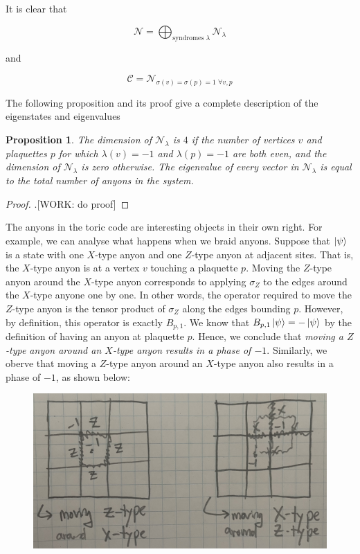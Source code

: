 \documentclass{article}
\newtheorem{proposition}{Proposition}[section]
\theoremstyle{definition}
\newcommand{\NN}{\mathcal{N}}
\newcommand{\C}{\mathscr{C}}
\newcommand{\0}{\left|0\right>}
\newcommand{\1}{\left|1\right>}
\numberwithin{figure}{section}
\begin{document}
It is clear that

$$\NN=\bigoplus_{\text{syndromes $\lambda$}}\NN_\lambda$$

and

$$\C=\NN_{\sigma(v)=\sigma(p)=1 \,\, \forall v,p}$$

The following proposition and its proof give a complete description of the eigenstates and eigenvalues

\begin{proposition}The dimension of $\NN_{\lambda}$ is $4$ if the number of vertices $v$ and plaquettes $p$ for which $\lambda(v)=-1$ and $\lambda(p)=-1$ are both even, and the dimension of $\NN_{\lambda}$ is zero otherwise. The eigenvalue of every vector in $\NN_{\lambda}$ is equal to the total number of anyons in the system.
\end{proposition}
\begin{proof}.[WORK: do proof]
\end{proof}

The anyons in the toric code are interesting objects in their own right. For example, we can analyse what happens when we braid anyons. Suppose that $\ket{\psi}$ is a state with one $X$-type anyon and one $Z$-type anyon at adjacent sites. That is, the $X$-type anyon is at a vertex $v$ touching a plaquette $p$. Moving the $Z$-type anyon around the $X$-type anyon corresponds to applying $\sigma_Z$ to the edges around the $X$-type anyone one by one. In other words, the operator required to move the $Z$-type anyon is the tensor product of $\sigma_Z$ along the edges bounding $p$. However, by definition, this operator is exactly $B_{p,1}$. We know that $B_{p,1}\ket{\psi}=-\ket{\psi}$ by the definition of having an anyon at plaquette $p$. Hence, we conclude that \textit{moving a $Z$-type anyon around an $X$-type anyon results in a phase of $-1$}. Similarly, we oberve that moving a $Z$-type anyon around an $X$-type anyon also results in a phase of $-1$, as shown below:

\begin{figure}[h]
\begin{center}
\includegraphics[scale=.04]{mutual-anyon-stats}
\end{center}
\end{figure}
\end{document}
